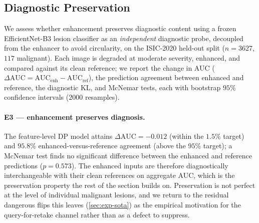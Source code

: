 
\subsection{Diagnostic Preservation}\label{sec:exp-preserve}
We assess whether enhancement preserves diagnostic content using a frozen EfficientNet-B3 lesion
classifier as an \emph{independent} diagnostic probe, decoupled from the enhancer to avoid
circularity, on the ISIC-2020 held-out split ($n=3627$, $117$ malignant). Each image is degraded at
moderate severity, enhanced, and compared against its clean reference; we report the change in AUC
($\Delta\mathrm{AUC}=\mathrm{AUC}_{\text{enh}}-\mathrm{AUC}_{\text{ref}}$), the prediction agreement
between enhanced and reference, the diagnostic KL, and McNemar tests, each with bootstrap $95\%$
confidence intervals ($2000$ resamples).

\paragraph{E3 --- enhancement preserves diagnosis.}
The feature-level DP model attains $\Delta\mathrm{AUC}=-0.012$ (within the $1.5\%$ target) and
$95.8\%$ enhanced-versus-reference agreement (above the $95\%$ target); a McNemar test finds no
significant difference between the enhanced and reference predictions ($p=0.573$). The enhanced inputs
are therefore diagnostically interchangeable with their clean references on aggregate AUC, which is the
preservation property the rest of the section builds on. Preservation is not perfect at the level of
individual malignant lesions, and we return to the residual dangerous flips this leaves
(\cref{sec:exp-sota}) as the empirical motivation for the query-for-retake channel rather than as a
defect to suppress.

